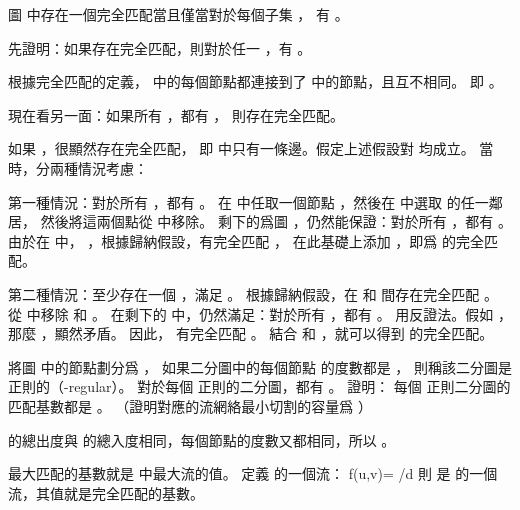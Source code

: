 圖  中存在一個完全匹配當且僅當對於每個子集 ，
有 。
\stopEXERCISE

\startANSWER
先證明：如果存在完全匹配，則對於任一 ，有 。

根據完全匹配的定義，  中的每個節點都連接到了  中的節點，且互不相同。
即 。

現在看另一面：如果所有 ，都有 ，
則存在完全匹配。

如果 ，很顯然存在完全匹配，
即  中只有一條邊。假定上述假設對  均成立。
當  時，分兩種情況考慮：

第一種情況：對於所有 ，都有 。
在  中任取一個節點 ，然後在  中選取  的任一鄰居，
然後將這兩個點從  中移除。
剩下的爲圖 ，仍然能保證：對於所有 ，都有 。
由於在  中， ，根據歸納假設，有完全匹配 ，
在此基礎上添加 ，即爲  的完全匹配。

第二種情況：至少存在一個 ，滿足 。
根據歸納假設，在  和  間存在完全匹配 。
從  中移除  和 。
在剩下的  中，仍然滿足：對於所有 ，都有 。
用反證法。假如 ，那麼 ，顯然矛盾。
因此，  有完全匹配 。
結合  和 ，就可以得到  的完全匹配。
\stopANSWER

\startEXERCISE\DIFFICULT
將圖  中的節點劃分爲 ，
如果二分圖中的每個節點  的度數都是 ，
則稱該二分圖是 {\EMP {} 正則的（-regular）}。
對於每個  正則的二分圖，都有 。
證明：
每個  正則二分圖的匹配基數都是 。
（\hint 證明對應的流網絡最小切割的容量爲 ）
\stopEXERCISE

\startANSWER
{} 的總出度與  的總入度相同，每個節點的度數又都相同，所以 。

最大匹配的基數就是  中最大流的值。
定義  的一個流：
\startformula
f(u,v)=\startcases
{}/d \MC {} \NR
{} \MC {} \NR
{} \MC {} \NR
\stopcases
\stopformula
則  是  的一個流，其值就是完全匹配的基數。
\stopANSWER

\stopsection
